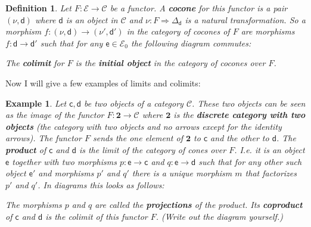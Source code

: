 \documentclass{article}
\newcommand{\cat}[1]{\mathcal{#1}} %
\newcommand{\cato}[1]{\cat{#1}_0} %
\newcommand{\ob}[1]{\mathsf{#1}} %
\newtheorem{definition}[theorem]{Definition}
\newtheorem{example}[theorem]{Example}
\begin{document}
\begin{definition}
	Let $F: \cat{E} \rightarrow \cat{C}$ be a functor. A \textbf{cocone} for this functor is a pair $(\nu, \ob{d})$ where $\ob{d}$ is an object in $\cat{C}$ and $\nu: F \Rightarrow \Delta_\ob{d}$ is a natural transformation.
	So a morphism $f: (\nu, \ob{d}) \rightarrow (\nu', \ob{d}')$ in the category of cocones of $F$ are morphisms $f: \ob{d} \rightarrow \ob{d}'$ such that for any $\ob{e} \in \cato{E}$ the following diagram commutes:
	The \textbf{colimit} for $F$ is the \textbf{initial object} in the category of cocones over $F$.
\end{definition}

Now I will give a few examples of limits and colimits:

\begin{example}
	Let $\ob{c}, \ob{d}$ be two objects of a category $\cat{C}$. These two objects can be seen as the image of the functor $F: \bm{2} \rightarrow \cat{C}$ where $\bm{2}$ is the \textbf{discrete category with two objects}
	(the category with two objects and no arrows except for the identity arrows). The functor $F$ sends the one element of $\bm{2}$ to $\ob{c}$ and the other to $\ob{d}$.
	The \textbf{product} of $\ob{c}$ and $\ob{d}$ is the limit of the category of cones over $F$.
	I.e. it is an object $\ob{e}$ together with two morphisms $p: \ob{e} \rightarrow \ob{c}$ and $q: \ob{e} \rightarrow \ob{d}$ such that for any other such object $\ob{e}'$ and morphisms $p'$ and $q'$ there is a unique morphism $m$ that factorizes $p'$ and $q'$.
	In diagrams this looks as follows:
	The morphisms $p$ and $q$ are called the \textbf{projections} of the product.
	Its \textbf{coproduct} of $\ob{c}$ and $\ob{d}$ is the colimit of this functor $F$. (Write out the diagram yourself.)
\end{example}
\end{document}

